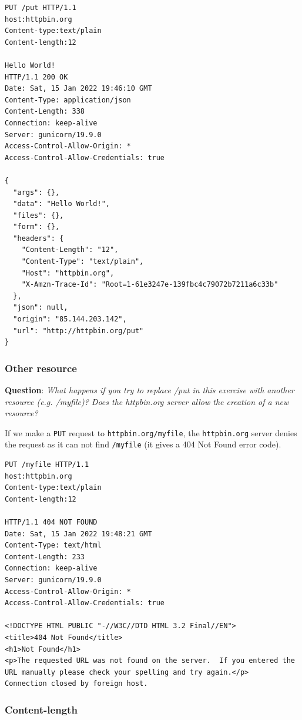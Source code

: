 \documentclass{article}
\begin{document}
\begin{lstlisting}
PUT /put HTTP/1.1
host:httpbin.org
Content-type:text/plain
Content-length:12

Hello World!
HTTP/1.1 200 OK
Date: Sat, 15 Jan 2022 19:46:10 GMT
Content-Type: application/json
Content-Length: 338
Connection: keep-alive
Server: gunicorn/19.9.0
Access-Control-Allow-Origin: *
Access-Control-Allow-Credentials: true

{
  "args": {},
  "data": "Hello World!",
  "files": {},
  "form": {},
  "headers": {
    "Content-Length": "12",
    "Content-Type": "text/plain",
    "Host": "httpbin.org",
    "X-Amzn-Trace-Id": "Root=1-61e3247e-139fbc4c79072b7211a6c33b"
  },
  "json": null,
  "origin": "85.144.203.142",
  "url": "http://httpbin.org/put"
}

\end{lstlisting}

\subsubsection{Other resource}

\textbf{Question}: \textit{What happens if you try to replace /put in this exercise with another resource (e.g. /myfile)? Does the httpbin.org server allow the creation of a new resource?}

If we make a \texttt{PUT} request to \texttt{httpbin.org/myfile}, the \texttt{httpbin.org} server denies the request as it can not find \texttt{/myfile} (it gives a 404 Not Found error code).

\begin{lstlisting}
PUT /myfile HTTP/1.1
host:httpbin.org
Content-type:text/plain
Content-length:12

HTTP/1.1 404 NOT FOUND
Date: Sat, 15 Jan 2022 19:48:21 GMT
Content-Type: text/html
Content-Length: 233
Connection: keep-alive
Server: gunicorn/19.9.0
Access-Control-Allow-Origin: *
Access-Control-Allow-Credentials: true

<!DOCTYPE HTML PUBLIC "-//W3C//DTD HTML 3.2 Final//EN">
<title>404 Not Found</title>
<h1>Not Found</h1>
<p>The requested URL was not found on the server.  If you entered the URL manually please check your spelling and try again.</p>
Connection closed by foreign host.
\end{lstlisting}

\subsubsection{Content-length}
\end{document}
